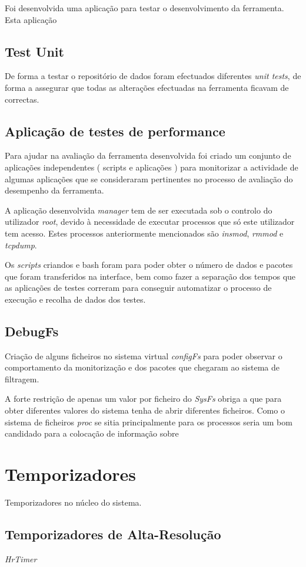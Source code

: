 Foi desenvolvida uma aplicação para testar o desenvolvimento da ferramenta.
Esta aplicação 

\subsection{Test Unit}

De forma a testar o repositório de dados foram efectuados diferentes \textit{unit tests}, de forma a assegurar que todas as alterações efectuadas na ferramenta ficavam de correctas.

\subsection{Aplicação de testes de performance}

Para ajudar na avaliação da ferramenta desenvolvida foi criado um conjunto de aplicações independentes ( scripts e aplicações ) para monitorizar a actividade de algumas aplicações que se consideraram pertinentes no processo de avaliação do desempenho da ferramenta.

A aplicação desenvolvida \textit{manager} tem de ser executada sob o controlo
do utilizador \textit{root}, devido à necessidade de executar processos que só
este utilizador tem acesso. Estes processos anteriormente mencionados são
\textit{insmod}, \textit{rmmod} e \textit{tcpdump}.

Os \textit{scripts} criandos e bash foram para poder obter o número de dados e
pacotes que foram transferidos na interface, bem como fazer a separação dos
tempos que as aplicações de testes correram para conseguir automatizar o
processo de execução e recolha de dados dos testes.

\subsection{DebugFs}

Criação de alguns ficheiros no sistema virtual \textit{configFs} para poder
observar o comportamento da monitorização e dos pacotes que chegaram ao sistema
de filtragem.

A forte restrição de apenas um valor por ficheiro do \textit{SysFs} obriga a
que para obter diferentes valores do sistema tenha de abrir diferentes
ficheiros. Como o sistema de ficheiros \textit{proc} se sitia principalmente
para os processos seria um bom candidado para a colocação de informação sobre 

\section{Temporizadores}

Temporizadores no núcleo do sistema.


\subsection{Temporizadores de Alta-Resolução}

\textit{HrTimer}
